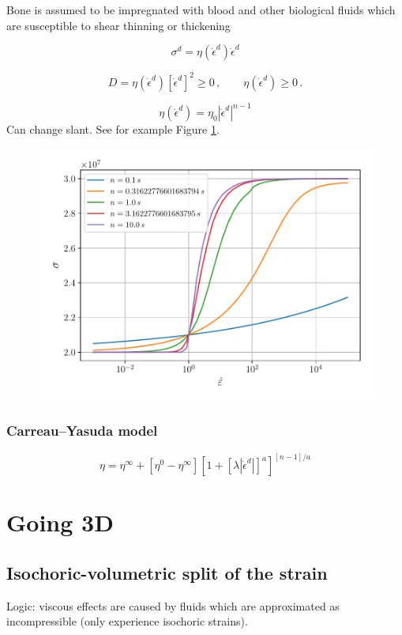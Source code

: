 \documentclass[12pt]{article}
\begin{document}
Bone is assumed to be impregnated with blood and other biological fluids which are susceptible to shear thinning or thickening

\begin{equation}
	\sigma^{d} = \eta(\dot{\epsilon}^{d})\dot{\epsilon}^{d}
\end{equation}

\begin{equation}
	D = \eta(\dot{\epsilon}^{d})\left[\dot{\epsilon}^{d}\right]^{2} \geq 0 \,, \qquad \eta(\dot{\epsilon}^{d})\geq 0\,.
\end{equation}

\begin{equation}
	\eta(\dot{\epsilon}^{d}) = \eta_{0} |\dot{\epsilon}^{d}|^{n-1}
\end{equation}
Can change slant. See for example Figure \ref{fig:odw}.
\begin{figure}[!htb]
	\centering
	\includegraphics[width=0.65\linewidth]{odw}
	\caption{ }
	\label{fig:odw}	
\end{figure}

\subsubsection{Carreau--Yasuda model}

\begin{equation}
	\eta = \eta^{\infty} + \left[\eta^{0}-\eta^{\infty}\right]\left[1 + \left[\lambda \left|\dot{\epsilon}^{d}\right|\right]^{a}\right]^{\left[n-1\right]/a}
\end{equation}

\section{Going 3D}

\subsection{Isochoric-volumetric split of the strain}
Logic: viscous effects are caused by fluids which are approximated as incompressible (only experience isochoric strains).
\end{document}
